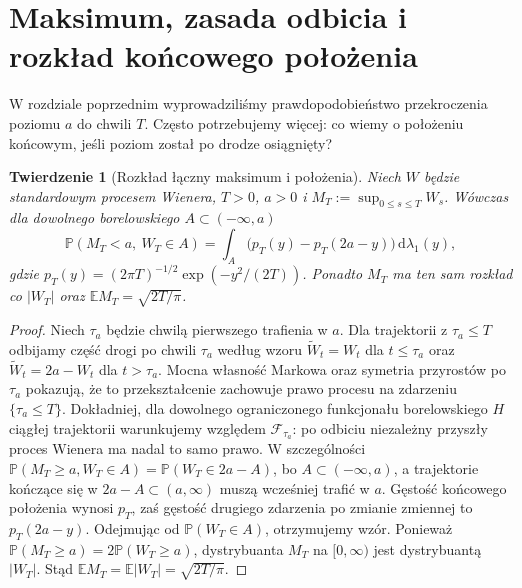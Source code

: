 \documentclass[11pt,a4paper,oneside]{report}
\numberwithin{equation}{chapter}
\theoremstyle{plain}
\newtheorem{twierdzenie}{Twierdzenie}[chapter]
\theoremstyle{definition}
\theoremstyle{remark}
\newcommand{\Prob}{\mathbb{P}}
\newcommand{\E}{\mathbb{E}}
\newcommand{\calF}{\mathcal{F}}
\newcommand{\dd}{\mathrm{d}}
\begin{document}
\section{Maksimum, zasada odbicia i rozkład końcowego położenia}
W rozdziale poprzednim wyprowadziliśmy prawdopodobieństwo
przekroczenia poziomu $a$ do chwili $T$. Często potrzebujemy
więcej: co wiemy o położeniu końcowym, jeśli poziom został
po drodze osiągnięty?

\begin{twierdzenie}[Rozkład łączny maksimum i położenia]
Niech $W$ będzie standardowym procesem Wienera,
$T>0$, $a>0$ i $M_T:=\sup_{0\le s\le T}W_s$.
Wówczas dla dowolnego borelowskiego $A\subset(-\infty,a)$
\[
\Prob(M_T<a,\ W_T\in A)
=\int_A\bigl(p_T(y)-p_T(2a-y)\bigr)\,\dd\lambda_1(y),
\]
gdzie $p_T(y)=(2\pi T)^{-1/2}\exp(-y^2/(2T))$.
Ponadto $M_T$ ma ten sam rozkład co $|W_T|$ oraz
$\E M_T=\sqrt{2T/\pi}$.
\end{twierdzenie}
\begin{proof}
Niech $\tau_a$ będzie chwilą pierwszego trafienia w $a$.
Dla trajektorii z $\tau_a\le T$ odbijamy część drogi
po chwili $\tau_a$ według wzoru
$\widetilde W_t=W_t$ dla $t\le\tau_a$ oraz
$\widetilde W_t=2a-W_t$ dla $t>\tau_a$.
Mocna własność Markowa oraz symetria przyrostów po
$\tau_a$ pokazują, że to przekształcenie zachowuje prawo
procesu na zdarzeniu $\{\tau_a\le T\}$. Dokładniej,
dla dowolnego ograniczonego funkcjonału borelowskiego
$H$ ciągłej trajektorii warunkujemy względem $\calF_{\tau_a}$:
po odbiciu niezależny przyszły proces Wienera ma nadal to samo prawo.
W szczególności
$\Prob(M_T\ge a,W_T\in A)=\Prob(W_T\in 2a-A)$,
bo $A\subset(-\infty,a)$, a trajektorie kończące się
w $2a-A\subset(a,\infty)$ muszą wcześniej trafić w $a$.
Gęstość końcowego położenia wynosi $p_T$, zaś gęstość
drugiego zdarzenia po zmianie zmiennej to $p_T(2a-y)$.
Odejmując od $\Prob(W_T\in A)$, otrzymujemy wzór.
Ponieważ $\Prob(M_T\ge a)=2\Prob(W_T\ge a)$,
dystrybuanta $M_T$ na $[0,\infty)$ jest dystrybuantą
$|W_T|$. Stąd
$\E M_T=\E|W_T|=\sqrt{2T/\pi}$.
\end{proof}
\end{document}
